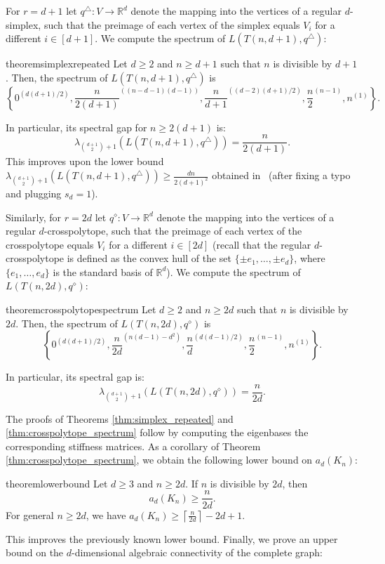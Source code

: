 \documentclass[a4paper,11pt]{article}
\theoremstyle{plain}
\theoremstyle{definition}
\newcommand{\Rea}{{\mathbb R}}
\begin{document}
For $r=d+1$ let $q^{\triangle}: V\to \Rea^d$ denote the mapping into the vertices of a regular $d$-simplex, such that the preimage of each vertex of the simplex equals $V_i$ for a different $i\in [d+1]$.  
We compute the spectrum of $L(T(n,d+1),q^{\triangle})$:

\begin{restatable}{theorem}{simplexrepeated}\label{thm:simplex_repeated}
Let $d\geq 2$ and $n\geq d+1$ such that $n$ is divisible by $d+1$. Then, the spectrum of $L(T(n,d+1),q^{\triangle})$ is
\[
    \left\{
    0^{(d(d+1)/2)},\frac{n}{2(d+1)}^{((n-d-1)(d-1))},\frac{n}{d+1}^{((d-2)(d+1)/2)},\frac{n}{2}^{(n-1)},
    n^{(1)}
    \right\}.
\]
\end{restatable}

In particular, 
its spectral gap for $n\geq 2(d+1)$ is:
\[
    \lambda_{\binom{d+1}{2}+1}(L(T(n,d+1),q^{\triangle}))= \frac{n}{2(d+1)}.
\]
This improves upon the lower bound $\lambda_{\binom{d+1}{2}+1}(L(T(n,d+1),q^{\triangle}))\geq \frac{d n}{2(d+1)^2}$ obtained  in~\cite{jordan2020rigidity} (after fixing a typo and plugging $s_d=1$).

Similarly, for $r=2d$ let $q^{\diamond}:V\to \Rea^d$ denote the mapping into the vertices of a regular $d$-crosspolytope, such that the preimage of each vertex of the crosspolytope equals $V_i$ for a different $i\in [2d]$ (recall that the regular $d$-crosspolytope is defined as the convex hull of the set $\{\pm e_1,\ldots, \pm e_d\}$, where $\{e_1,\ldots,e_d\}$ is the standard basis of $\Rea^d$). We compute the spectrum of $L(T(n,2d),q^{\diamond})$:

\begin{restatable}{theorem}{crosspolytopespectrum}\label{thm:crosspolytope_spectrum}
Let $d\geq 2$ and $n\geq 2d$ such that $n$ is divisible by $2d$. 
Then, the spectrum of $L(T(n,2d),q^{\diamond})$ is
\[
    \left\{
    0^{(d(d+1)/2)},\frac{n}{2d}^{(n(d-1)-d^2)},\frac{n}{d}^{(d(d-1)/2)},\frac{n}{2}^{(n-1)},
    n^{(1)}
    \right\}.
\]
\end{restatable}
In particular, 
its spectral gap is:
\[
    \lambda_{\binom{d+1}{2}+1}(L(T(n,2d),q^{\diamond}))= \frac{n}{2d}.
\]

The proofs of Theorems \ref{thm:simplex_repeated} and \ref{thm:crosspolytope_spectrum} follow by computing the eigenbases the corresponding stiffness matrices.
As a corollary of Theorem \ref{thm:crosspolytope_spectrum}, we obtain
the following lower bound on $a_d(K_n)$:

\begin{restatable}{theorem}{lowerbound}\label{thm:lower_bound}
Let $d\geq 3$ and $n\geq 2d$. If $n$ is divisible by $2d$, then
\[
      a_d(K_n)\geq \frac{n}{2d}.
\]
For general $n\geq 2d$, we have
$
    a_d(K_n)\geq \left\lceil\frac{n}{2d}\right\rceil-2d+1.
$
\end{restatable} 
This improves the previously known lower bound. Finally, we prove an upper bound on the $d$-dimensional algebraic connectivity of the complete graph:
\end{document}
